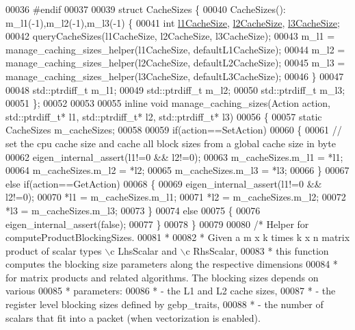 \begin{DoxyCode}
00036 \textcolor{preprocessor}{#endif}
00037 
00039 \textcolor{keyword}{struct }CacheSizes \{
00040   CacheSizes(): m\_l1(-1),m\_l2(-1),m\_l3(-1) \{
00041     \textcolor{keywordtype}{int} \hyperlink{namespace_eigen_a2669f89ff38296a38e6d973552eb4e33}{l1CacheSize}, \hyperlink{namespace_eigen_a2cfc0330ba567d63a496be1cac8427ae}{l2CacheSize}, \hyperlink{namespace_eigen_ae2efa4852ea90c2d47b7dcec5b40ba2b}{l3CacheSize};
00042     queryCacheSizes(l1CacheSize, l2CacheSize, l3CacheSize);
00043     m\_l1 = manage\_caching\_sizes\_helper(l1CacheSize, defaultL1CacheSize);
00044     m\_l2 = manage\_caching\_sizes\_helper(l2CacheSize, defaultL2CacheSize);
00045     m\_l3 = manage\_caching\_sizes\_helper(l3CacheSize, defaultL3CacheSize);
00046   \}
00047 
00048   std::ptrdiff\_t m\_l1;
00049   std::ptrdiff\_t m\_l2;
00050   std::ptrdiff\_t m\_l3;
00051 \};
00052 
00053 
00055 \textcolor{keyword}{inline} \textcolor{keywordtype}{void} manage\_caching\_sizes(Action action, std::ptrdiff\_t* l1, std::ptrdiff\_t* l2, std::ptrdiff\_t* l3)
00056 \{
00057   \textcolor{keyword}{static} CacheSizes m\_cacheSizes;
00058 
00059   \textcolor{keywordflow}{if}(action==SetAction)
00060   \{
00061     \textcolor{comment}{// set the cpu cache size and cache all block sizes from a global cache size in byte}
00062     eigen\_internal\_assert(l1!=0 && l2!=0);
00063     m\_cacheSizes.m\_l1 = *l1;
00064     m\_cacheSizes.m\_l2 = *l2;
00065     m\_cacheSizes.m\_l3 = *l3;
00066   \}
00067   \textcolor{keywordflow}{else} \textcolor{keywordflow}{if}(action==GetAction)
00068   \{
00069     eigen\_internal\_assert(l1!=0 && l2!=0);
00070     *l1 = m\_cacheSizes.m\_l1;
00071     *l2 = m\_cacheSizes.m\_l2;
00072     *l3 = m\_cacheSizes.m\_l3;
00073   \}
00074   \textcolor{keywordflow}{else}
00075   \{
00076     eigen\_internal\_assert(\textcolor{keyword}{false});
00077   \}
00078 \}
00079 
00080 \textcolor{comment}{/* Helper for computeProductBlockingSizes.}
00081 \textcolor{comment}{ *}
00082 \textcolor{comment}{ * Given a m x k times k x n matrix product of scalar types \(\backslash\)c LhsScalar and \(\backslash\)c RhsScalar,}
00083 \textcolor{comment}{ * this function computes the blocking size parameters along the respective dimensions}
00084 \textcolor{comment}{ * for matrix products and related algorithms. The blocking sizes depends on various}
00085 \textcolor{comment}{ * parameters:}
00086 \textcolor{comment}{ * - the L1 and L2 cache sizes,}
00087 \textcolor{comment}{ * - the register level blocking sizes defined by gebp\_traits,}
00088 \textcolor{comment}{ * - the number of scalars that fit into a packet (when vectorization is enabled).}

\end{DoxyCode}
